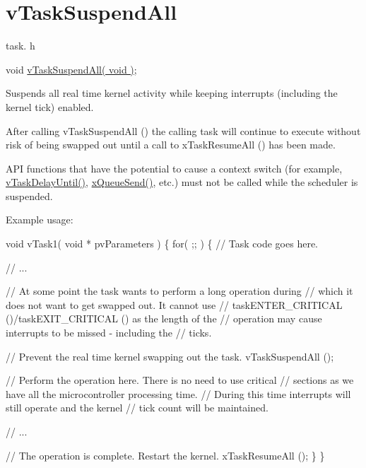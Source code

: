 \hypertarget{group__vTaskSuspendAll}{}\section{v\+Task\+Suspend\+All}
\label{group__vTaskSuspendAll}
task. h 
\begin{DoxyPre}void \hyperlink{task_8h_a366b302eba79d10b5ee2a3756f0fcc43}{vTaskSuspendAll( void )};\end{DoxyPre}


Suspends all real time kernel activity while keeping interrupts (including the kernel tick) enabled.

After calling v\+Task\+Suspend\+All () the calling task will continue to execute without risk of being swapped out until a call to x\+Task\+Resume\+All () has been made.

A\+PI functions that have the potential to cause a context switch (for example, \hyperlink{task_8h_a3033ef5b1abc8618ea205d1082b21bb6}{v\+Task\+Delay\+Until()}, \hyperlink{queue_8h_af7eb49d3249351176992950d9185abe9}{x\+Queue\+Send()}, etc.) must not be called while the scheduler is suspended.

Example usage\+: 
\begin{DoxyPre}
void vTask1( void * pvParameters )
\{
    for( ;; )
    \{
     // Task code goes here.\end{DoxyPre}



\begin{DoxyPre}     // ...\end{DoxyPre}



\begin{DoxyPre}     // At some point the task wants to perform a long operation during
     // which it does not want to get swapped out.  It cannot use
     // taskENTER\_CRITICAL ()/taskEXIT\_CRITICAL () as the length of the
     // operation may cause interrupts to be missed - including the
     // ticks.\end{DoxyPre}



\begin{DoxyPre}     // Prevent the real time kernel swapping out the task.
     vTaskSuspendAll ();\end{DoxyPre}



\begin{DoxyPre}     // Perform the operation here.  There is no need to use critical
     // sections as we have all the microcontroller processing time.
     // During this time interrupts will still operate and the kernel
     // tick count will be maintained.\end{DoxyPre}



\begin{DoxyPre}     // ...\end{DoxyPre}



\begin{DoxyPre}     // The operation is complete.  Restart the kernel.
     xTaskResumeAll ();
    \}
\}
  \end{DoxyPre}
 